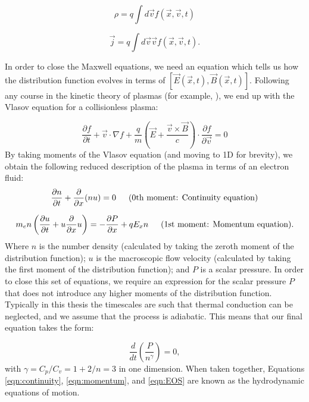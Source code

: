 \begin{equation}
\rho= q \int d \vec{v} f(\vec{x},\vec{v},t)
\end{equation}

\begin{equation}
\vec{j} = q \int d \vec{v} \vec{v} f(\vec{x},\vec{v},t).
\end{equation}

In order to close the Maxwell equations, we need an equation which tells us how the distribution function evolves in terms of $[\vec{E}(\vec{x},t),\vec{B}(\vec{x},t)]$. Following any course in the kinetic theory of plasmas (for example, \citet{MMathPhys}), we end up with the Vlasov equation for a collisionless plasma:

\begin{equation}
 	\frac{\partial f}{\partial t}+\vec{v} \cdot {\nabla} f+\frac{q}{m}\left(\vec{E}+\frac{\vec{v} \times \vec{B}}{c}\right) \cdot \frac{\partial f}{\partial \vec{v}}=0
\end{equation} By taking moments of the Vlasov equation (and moving to 1D for brevity), we obtain the following reduced description of the plasma in terms of an electron fluid: 
\begin{equation}
\frac{\partial n}{\partial t}+\frac{\partial}{\partial x}(n u)=0 \text{\,\,\,\,\,\,\,\,\,(0th moment: Continuity equation)}
\label{eqn:continuity}
\end{equation}

\begin{equation}
m_e n \left(\frac{\partial u}{\partial t} + u\frac{\partial}{\partial x}u\right)=-\frac{\partial P}{\partial x}+q E_{x} n \text{\,\,\,\,\,\,\,\,\,(1st moment: Momentum equation)}.
\label{eqn:momentum}
\end{equation} Where $n$ is the number density (calculated by taking the zeroth moment of the distribution function); $u$ is the macroscopic flow velocity (calculated by taking the first moment of the distribution function); and $P$ is a scalar pressure. In order to close this set of equations, we require an expression for the scalar pressure $P$ that does not introduce any higher moments of the distribution function. Typically in this thesis the timescales are such that thermal conduction can be neglected, and we assume that the process is adiabatic. This means that our final equation takes the form:

\begin{equation}
\frac{d}{dt}\left(\frac{P}{n^{\gamma}}\right) = 0,
\label{eqn:EOS}
\end{equation} with $\gamma = C_p/C_v = 1 + 2/n = 3$ in one dimension.  When taken together, Equations \ref{eqn:continuity}, \ref{eqn:momentum}, and \ref{eqn:EOS} are known as the hydrodynamic equations of motion.

